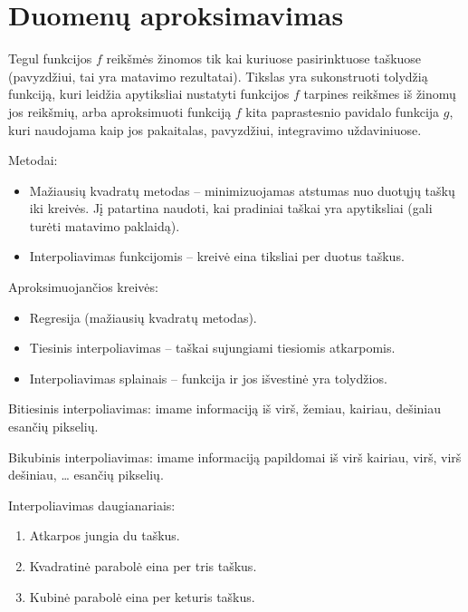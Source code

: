 

\section{Duomenų aproksimavimas}


Tegul funkcijos $f$ reikšmės žinomos tik kai kuriuose pasirinktuose
taškuose (pavyzdžiui, tai yra matavimo rezultatai). Tikslas yra
sukonstruoti tolydžią funkciją, kuri leidžia apytiksliai nustatyti
funkcijos $f$ tarpines reikšmes iš žinomų jos reikšmių, arba
aproksimuoti funkciją $f$ kita paprastesnio pavidalo funkcija $g$, kuri
naudojama kaip jos pakaitalas, pavyzdžiui, integravimo uždaviniuose.

Metodai:
\begin{itemize}
  \item Mažiausių kvadratų metodas – minimizuojamas atstumas nuo
    duotųjų taškų iki kreivės. Jį patartina naudoti, kai pradiniai
    taškai yra apytiksliai (gali turėti matavimo paklaidą).
  \item Interpoliavimas funkcijomis – kreivė eina tiksliai per duotus
    taškus.
\end{itemize}


Aproksimuojančios kreivės:
\begin{itemize}
  \item Regresija (mažiausių kvadratų metodas).
  \item Tiesinis interpoliavimas – taškai sujungiami tiesiomis atkarpomis.
  \item Interpoliavimas splainais – funkcija ir jos išvestinė yra tolydžios.
\end{itemize}



Bitiesinis interpoliavimas: imame informaciją iš virš, žemiau,
kairiau, dešiniau esančių pikselių.

Bikubinis interpoliavimas: imame informaciją papildomai iš virš kairiau, virš,
virš dešiniau, … esančių pikselių.



Interpoliavimas daugianariais:
\begin{enumerate}
  \item Atkarpos jungia du taškus.
  \item Kvadratinė parabolė eina per tris taškus.
  \item Kubinė parabolė eina per keturis taškus.
\end{enumerate}

